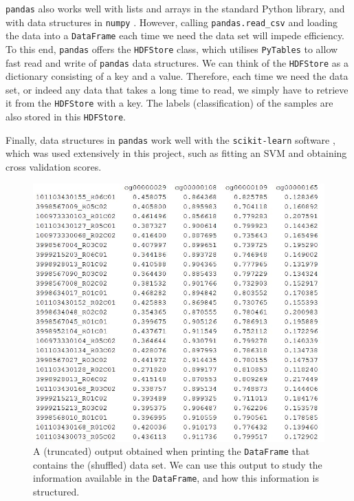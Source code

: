 \documentclass[12pt, twoside, a4paper]{report}
\begin{document}
\texttt{pandas} also works well with lists and arrays in the standard Python library, and with data structures in \texttt{numpy} \cite{RefWorks:214}. However, calling \texttt{pandas.read\_csv} and loading the data into a \texttt{DataFrame} each time we need the data set will impede efficiency. To this end, \texttt{pandas} offers the \texttt{HDFStore} class, which utilises \texttt{PyTables} \cite{pytables} to allow fast read and write of \texttt{pandas} data structures. We can think of the \texttt{HDFStore} as a dictionary consisting of a key and a value. Therefore, each time we need the data set, or indeed any data that takes a long time to read, we simply have to retrieve it from the \texttt{HDFStore} with a key. The labels (classification) of the samples are also stored in this \texttt{HDFStore}.

Finally, data structures in  \texttt{pandas} work well with the \texttt{scikit-learn} software \cite{scikit-learn}, which was used extensively in this project, such as fitting an SVM and obtaining cross validation scores.

\begin{figure}
\centering
\includegraphics[scale=0.9]{images/pandas-example.JPG}
\caption{A (truncated) output obtained when printing the \texttt{DataFrame} that contains the (shuffled) data set. We can use this output to study the information available in the \texttt{DataFrame}, and how this information is structured.}
\label{data:pandas:example}
\end{figure}
\end{document}
